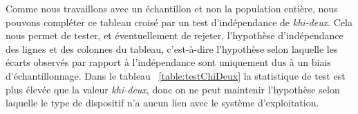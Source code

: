 Comme nous travaillons avec un échantillon et non la population entière, nous pouvons compléter ce tableau croisé par un test d'indépendance de \emph{khi-deux}. Cela nous permet de tester, et éventuellement de rejeter, l'hypothèse d'indépendance des lignes et des colonnes du tableau, c'est-à-dire l'hypothèse selon laquelle les écarts observés par rapport à l'indépendance sont uniquement dus à un biais d'échantillonnage. Dans le tableau ~\ref{table:testChiDeux} la statistique de test est plus élevée que la valeur  \emph{khi-deux}, donc on ne peut maintenir l'hypothèse selon laquelle le type de dispositif n'a aucun lien avec le système d'exploitation.




